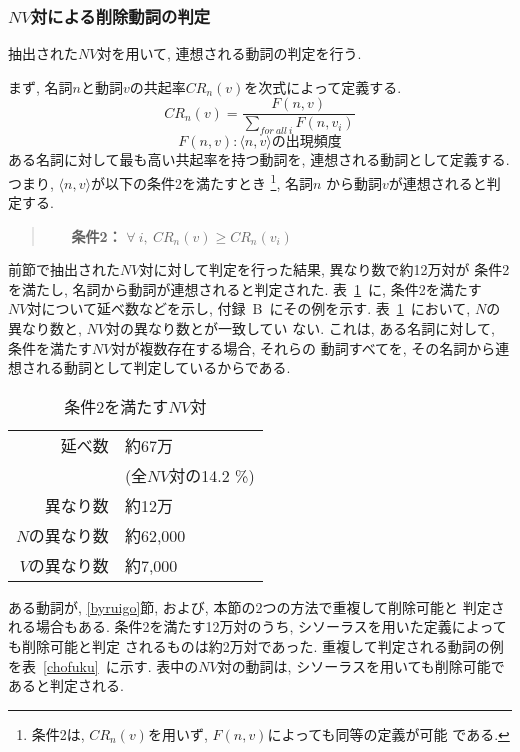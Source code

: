 \subsubsection{$NV$対による削除動詞の判定}\label{nvhantei}
抽出された$NV対$を用いて, 連想される動詞の判定を行う.

まず, 名詞$n$と動詞$v$の共起率$CR_n(v)$を次式によって定義する.
$$
  CR_{n}(v) = \frac{F(n,v)}
  {\displaystyle{\sum_{for\ all\ i}{F(n, v_{i})}}}
$$
$$
  F(n,v): \langle n, v \rangle の出現頻度
$$
ある名詞に対して最も高い共起率を持つ動詞を, 連想される動詞として定義する.
つまり, $\langle n, v \rangle$が以下の条件2を満たすとき
\footnote{条件2は, $CR_n(v)$を用いず, $F(n,v)$によっても同等の定義が可能
である.}, 名詞$n$ から動詞$v$が連想されると判定する.
\vspace{5mm}
\begin{quote}
\begin{itemize}
\item[\bf 条件2：] $\forall\ i,\ CR_n(v) \geq CR_n(v_{i})$
\end{itemize}
\end{quote}
\vspace{5mm}
前節で抽出された$NV対$に対して判定を行った結果, 異なり数で約12万対が
条件2を満たし, 名詞から動詞が連想されると判定された.
表~\ref{saiyo}~に, 条件2を満たす$NV対$について延べ数などを示し, 
付録~B~にその例を示す. 
表~\ref{saiyo}~において, $N$の異なり数と, $NV対$の異なり数とが一致してい
ない. 
これは, ある名詞に対して, 条件を満たす$NV対$が複数存在する場合, それらの
動詞すべてを, その名詞から連想される動詞として判定しているからである. 

\begin{table}[hbtp]
\begin{center}
\caption{条件2を満たす$NV対$}
\label{saiyo}
\begin{tabular}{|rl|}
\hline
 延べ数 & 約67万\\
 & (全$NV対$の14.2 \%)\\
 異なり数 & 約12万\\
 $N$の異なり数 & 約62,000\\
 $V$の異なり数 & 約7,000\\
\hline
\end{tabular}
\end{center}
\end{table}

ある動詞が, \ref{byruigo}節, および, 本節の2つの方法で重複して削除可能と
判定される場合もある.
条件2を満たす12万対のうち, シソーラスを用いた定義によっても削除可能と判定
されるものは約2万対であった.
重複して判定される動詞の例を表~\ref{chofuku}~に示す.
表中の$NV対$の動詞は, シソーラスを用いても削除可能であると判定される.

